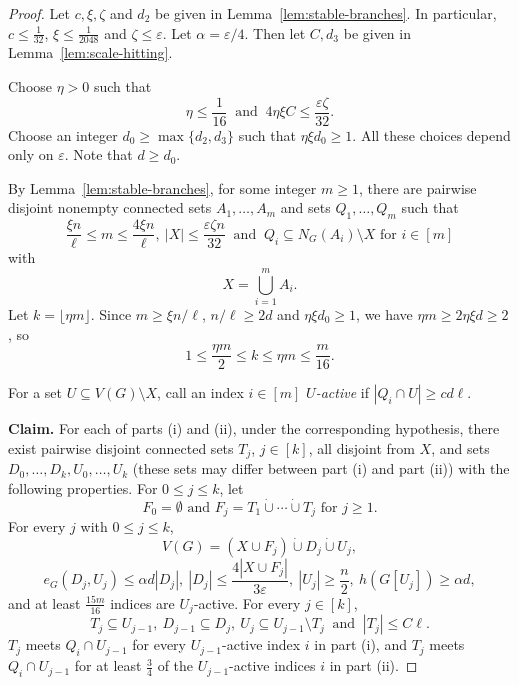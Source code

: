 \documentclass[11pt,a4paper]{article}
\theoremstyle{definition}
\theoremstyle{remark}
\newcommand{\eps}{\varepsilon}
\begin{document}
\begin{proof}
Let $c,\xi,\zeta$ and $d_2$ be given in
Lemma~\ref{lem:stable-branches}.  In particular, $c\le\frac{1}{32}$,
$\xi\le\frac{1}{2048}$ and $\zeta\le\eps$. Let $\alpha=\eps/4$.
Then let $C,d_3$ be given in  Lemma~\ref{lem:scale-hitting}.


Choose $\eta>0$ such that
\[
 \eta\le\frac{1}{16}
 \ \text{ and }\ 
 4\eta\xi C\le\frac{\eps\zeta}{32}.
\]
Choose  an integer $d_0\ge \max\{d_2, d_3\}$ such that  $\eta\xi d_0\ge1$. 
All these choices depend only on $\eps$. Note that $d\ge d_0$. 


By Lemma~\ref{lem:stable-branches}, for some integer $m\ge 1$, there are 
pairwise disjoint nonempty connected sets $A_1,\ldots,A_m$ and
sets $Q_1,\ldots,Q_m$ such that 
\[
 \frac{\xi n}{\ell}\le m\le\frac{4\xi n}{\ell},
 \ |X|\le\frac{\eps\zeta n}{32}
 \ \text{ and } \  Q_i\subseteq N_G(A_i)\setminus X
 \text{ for } i\in[m]
\]
with 
\[
 X=\bigcup_{i=1}^mA_i.
\]
Let $k=\lfloor\eta m\rfloor$. Since $m\ge\xi n/\ell$,
$n/\ell\ge2d$ and $\eta\xi d_0\ge1$, we have
$\eta m\ge2\eta\xi d\ge2$, so
\[
1\le\frac{\eta m}{2}\le k\le\eta m\le\frac m{16}.
\]

For a set $U\subseteq V(G)\setminus X$, call an index $i\in[m]$
\emph{$U$-active} if $|Q_i\cap U|\ge cd\ell$.




\medskip
\noindent\textbf{Claim.}
For each of parts (i) and (ii), under the
corresponding hypothesis, there exist pairwise disjoint connected sets
$T_j$, $j\in[k]$, all disjoint from $X$, and sets
$D_0,\ldots,D_k,U_0,\ldots,U_k$ (these sets
may differ between part (i) and part (ii)) with the following properties. 
For $0\le j\le k$, let
\[
 F_0=\emptyset
 \text{ and }
 F_j=T_1\mathbin{\dot\cup}\cdots\mathbin{\dot\cup}T_j
 \text{ for } j\ge 1.
\]
For every $j$ with $0\le j\le k$,
\begin{equation}\label{eq:scale-recursive-partition}
 V(G)=(X\cup F_j)\mathbin{\dot\cup}D_j
       \mathbin{\dot\cup}U_j,
\end{equation}
\[
 e_G(D_j,U_j)\le\alpha d|D_j|,
 \ 
 |D_j|\le\frac{4|X\cup F_j|}{3\eps},
 \ 
 |U_j|\ge\frac{n}{2}, \
 h(G[U_j])\ge\alpha d,
\]
and at least $\frac{15m}{16}$ indices are $U_j$-active.
For every $j\in [k]$,
\[
 T_j\subseteq U_{j-1},
 \ 
 D_{j-1}\subseteq D_j,
 \ 
 U_j\subseteq U_{j-1}\setminus T_j \
 \text{ and }\ 
 |T_j|\le C\ell.
\]
$T_j$ meets $Q_i\cap U_{j-1}$
for every $U_{j-1}$-active index $i$ in part (i), 
and 
$T_j$ meets $Q_i\cap U_{j-1}$ for at least $\frac34$ of
the $U_{j-1}$-active indices $i$ in part (ii).


\end{proof}
\end{document}
